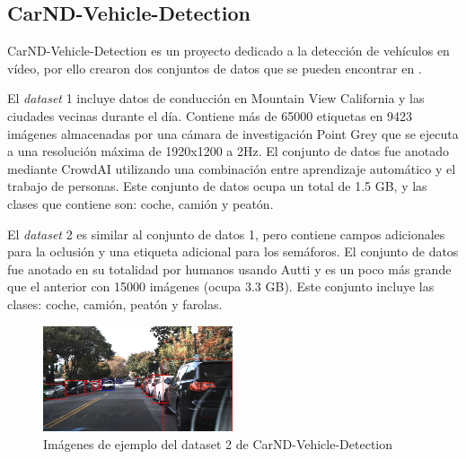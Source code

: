 \subsection{CarND-Vehicle-Detection}

CarND-Vehicle-Detection \cite{carnd1} es un proyecto dedicado a la detección de vehículos en vídeo, por ello crearon dos conjuntos de datos que se pueden encontrar en \cite{carnd2}.

El \textit{dataset} 1 incluye datos de conducción en Mountain View California y las ciudades vecinas durante el día. Contiene más de 65000 etiquetas en 9423 imágenes almacenadas por una cámara de investigación Point Grey que se ejecuta a una resolución máxima de 1920x1200 a 2Hz. El conjunto de datos fue anotado mediante CrowdAI utilizando una combinación entre aprendizaje automático y el trabajo de personas. Este conjunto de datos ocupa un total de 1.5 GB, y las clases que contiene son: coche, camión y peatón.

El \textit{dataset} 2 es similar al conjunto de datos 1, pero contiene campos adicionales para la oclusión y una etiqueta adicional para los semáforos. El conjunto de datos fue anotado en su totalidad por humanos usando Autti y es un poco más grande que el anterior con 15000 imágenes (ocupa 3.3 GB). Este conjunto incluye las clases: coche, camión, peatón y farolas.

\begin{figure}
\begin{center}
	\includegraphics[width=0.5\textwidth]{figures/Estado_arte/carnd_dataset2.png}
   \caption{Imágenes de ejemplo del dataset 2 de CarND-Vehicle-Detection}
	\label{fig.carnd}
\end{center}
\end{figure}
